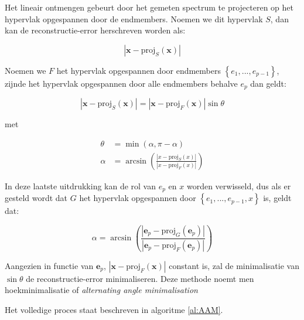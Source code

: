 \documentclass[12pt]{report}
\newcommand{\proj}[2]{\text{proj}_{#2}\left(#1\right)}
\begin{document}
Het lineair ontmengen gebeurt door het gemeten spectrum te projecteren op het hypervlak opgespannen door de endmembers. Noemen we dit hypervlak $S$, dan kan de reconstructie-error herschreven worden als:

\begin{equation}
\left| \bm{x} - \proj{\bm{x}}{S}\right|
\end{equation}

Noemen we $F$ het hypervlak opgespannen door endmembers $\left\{ e_1 , ... , e_{p-1} \right\}$, zijnde het hypervlak opgespannen door alle endmembers behalve $e_p$ dan geldt:

\begin{equation}
\left| \bm{x} - \proj{\bm{x}}{S}\right|  = \left| \bm{x} - \proj{\bm{x}}{F}\right| \sin \theta
\end{equation}

met 

\begin{align}
\theta &= \min(\alpha, \pi-\alpha) \\
\alpha &= \arcsin \left(\frac{\left|x - \proj{x}{S}\right|}{\left|x - \proj{x}{F}\right|}\right)
\end{align}

In deze laatste uitdrukking kan de rol van $e_p$ en $x$ worden verwisseld, dus als er gesteld wordt dat $G$ het hypervlak opgespannen door $\left\{ e_1 , ... ,e_{p-1}, x \right\}$ is, geldt dat:

\begin{equation}
\alpha = \arcsin \left(\frac{\left|\bm{e}_p - \proj{\bm{e}_p}{G}\right|}{\left|\bm{e}_p - \proj{\bm{e}_p}{F}\right|}\right)
\end{equation} 

Aangezien in functie van $\bm{e}_p$, $\left| \bm{x} - \proj{\bm{x}}{F}\right|$ constant is, zal de minimalisatie van $\sin \theta$ de reconstructie-error minimaliseren. Deze methode noemt men hoekminimalisatie of \textit{alternating angle minimalisation}

\vspace{5 mm}

Het volledige proces staat beschreven in algoritme \ref{al:AAM}.
\end{document}
